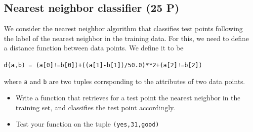 \documentclass[11pt]{article}
\providecommand{\tightlist}{%
      \setlength{\itemsep}{0pt}\setlength{\parskip}{0pt}}
\begin{document}
    \subsection{Nearest neighbor classifier (25
P)}\label{nearest-neighbor-classifier-25-p}

We consider the nearest neighbor algorithm that classifies test points
following the label of the nearest neighbor in the training data. For
this, we need to define a distance function between data points. We
define it to be

\texttt{d(a,b)\ =\ (a{[}0{]}!=b{[}0{]})+((a{[}1{]}-b{[}1{]})/50.0)**2+(a{[}2{]}!=b{[}2{]})}

where \texttt{a} and \texttt{b} are two tuples corrsponding to the
attributes of two data points.

\begin{itemize}
\tightlist
\item
  Write a function that retrieves for a test point the nearest neighbor
  in the training set, and classifies the test point accordingly.
\item
  Test your function on the tuple
  \texttt{(\textquotesingle{}yes\textquotesingle{},31,\textquotesingle{}good\textquotesingle{})}
\end{itemize}
\end{document}
